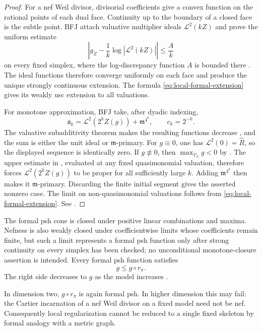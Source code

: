 \begin{proof}
For a nef Weil divisor, divisorial coefficients give a convex function on
the rational points of each dual face.  Continuity up to the boundary of a
closed face is the subtle point.  BFJ attach valuative multiplier ideals
$\mathcal L^2(kZ)$ and prove the uniform estimate
\[
 \left|g_Z-\frac1k\log|\mathcal L^2(kZ)|\right|
                   \leq\frac{A}{k}
\tag{70.16}\label{eq:local-multiplier-uniform-estimate}
\]
on every fixed simplex, where the log-discrepancy function $A$ is bounded
there \cite[Theorem~3.9]{BFJ08}.  The ideal functions therefore converge
uniformly on each face and
produce the unique strongly continuous extension.  The formula
\eqref{eq:local-formal-extension} gives its weakly usc extension to all
valuations.

For monotone approximation, BFJ take, after dyadic indexing,
\[
 \mathfrak a_k=\mathcal L^2(2^kZ(g))+\mathfrak m^{4^k},
 \qquad c_k=2^{-k}.
\]
The valuative subadditivity theorem makes the resulting functions decrease
\cite[Theorem~3.10]{BFJ08},
and the sum is either the unit ideal or $\mathfrak m$-primary.  For
$g\equiv0$, one has $\mathcal L^2(0)=\widehat R$, so the displayed
sequence is identically zero.  If $g\not\equiv0$, then
$\max_{\mathcal V_0}g<0$ by \cite[Proposition~3.14]{BFJ08}.  The upper
estimate in \cite[Theorem~3.9]{BFJ08}, evaluated at any fixed
quasimonomial valuation, therefore forces $\mathcal L^2(2^kZ(g))$ to be
proper for all sufficiently large $k$.  Adding $\mathfrak m^{4^k}$
then makes it $\mathfrak m$-primary.  Discarding the finite initial segment
gives the asserted nonzero case.  The limit on non-quasimonomial valuations follows from
\eqref{eq:local-formal-extension}.  See
\cite[Propositions~3.11 and 3.13]{BFJ08}.
\end{proof}

The formal psh cone is closed under positive linear combinations and
maxima.  Nefness is also weakly closed under coefficientwise limits whose
coefficients remain finite,
but such a limit represents a formal psh function only after strong
continuity on every simplex has been checked; no unconditional
monotone-closure assertion is intended.  Every formal psh function satisfies
\[
                              g\leq g\circ r_\pi.
\tag{70.17}\label{eq:local-retraction-inequality}
\]
The right side decreases to $g$ as the model increases
\cite[Proposition~2.7]{BFJ08}.

\begin{remark}
\label{rem:local-retraction-trap}
In dimension two, $g\circ r_\pi$ is again formal psh.  In higher
dimension this may fail: the Cartier incarnation of a nef Weil divisor on a
fixed model need not be nef.  Consequently local regularization cannot be
reduced to a single fixed skeleton by formal analogy with a metric graph.
\end{remark}

